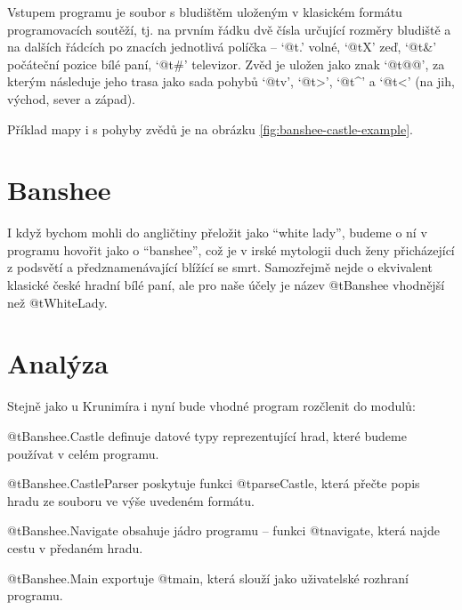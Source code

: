 Vstupem programu je soubor s bludištěm uloženým v klasickém formátu
programovacích soutěží, tj. na prvním řádku dvě čísla určující rozměry bludiště
a na dalších řádcích po znacích jednotlivá políčka -- `@t{.}' volné, `@t{X}'
zeď, `@t{\&}' počáteční pozice bílé paní, `@t{\#}' televizor. Zvěd je uložen
jako znak `@t{@@}', za kterým následuje jeho trasa jako sada pohybů `@t{v}',
`@t{>}', `@t{\^}' a `@t{<}' (na jih, východ, sever a západ). 

Příklad mapy i s pohyby zvědů je na obrázku \ref{fig:banshee-castle-example}.



\section{Banshee}

I když bychom mohli do angličtiny přeložit  jako ``white lady'',
budeme o ní v programu hovořit jako o ``banshee'', což je v irské mytologii duch
ženy přicházející z podsvětí a předznamenávající blížící se smrt. Samozřejmě
nejde o ekvivalent klasické české hradní bílé paní, ale pro naše účely je název
@t{Banshee} vhodnější než @t{WhiteLady}.

\section{Analýza}

Stejně jako u Krunimíra i nyní bude vhodné program rozčlenit do modulů:

\begin{description}

  \item @t{Banshee.Castle} definuje datové typy reprezentující hrad, které
    budeme používat v celém programu.

  \item @t{Banshee.CastleParser} poskytuje funkci @t{parseCastle}, která přečte
    popis hradu ze souboru ve výše uvedeném formátu.

  \item @t{Banshee.Navigate} obsahuje jádro programu -- funkci @t{navigate},
    která najde cestu v předaném hradu.

  \item @t{Banshee.Main} exportuje @t{main}, která slouží jako uživatelské
    rozhraní programu.

\end{description}

